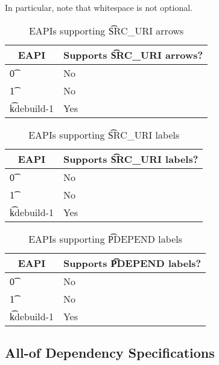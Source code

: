 In particular, note that whitespace is not optional.

\IFKDEBUILDELSE
{
    \begin{table}
    \centering
    \caption{EAPIs supporting \t{SRC\_URI} arrows} \label{uri-arrows-table}
    \begin{tabular}{ l l }
        \toprule
        \multicolumn{1}{c}{\textbf{EAPI}} &
        \multicolumn{1}{c}{\textbf{Supports \t{SRC\_URI} arrows?}} \\
        \midrule
    \t{0} & No \\
    \t{1} & No \\
    \t{kdebuild-1} & Yes \\
    \bottomrule
    \end{tabular}
    \end{table}

    \begin{table}
    \centering
    \caption{EAPIs supporting \t{SRC\_URI} labels} \label{uri-labels-table}
    \begin{tabular}{ l l }
        \toprule
        \multicolumn{1}{c}{\textbf{EAPI}} &
        \multicolumn{1}{c}{\textbf{Supports \t{SRC\_URI} labels?}} \\
        \midrule
    \t{0} & No \\
    \t{1} & No \\
    \t{kdebuild-1} & Yes \\
    \bottomrule
    \end{tabular}
    \end{table}

    \begin{table}
    \centering
    \caption{EAPIs supporting \t{PDEPEND} labels} \label{pdepend-labels-table}
    \begin{tabular}{ l l }
        \toprule
        \multicolumn{1}{c}{\textbf{EAPI}} &
        \multicolumn{1}{c}{\textbf{Supports \t{PDEPEND} labels?}} \\
        \midrule
    \t{0} & No \\
    \t{1} & No \\
    \t{kdebuild-1} & Yes \\
    \bottomrule
    \end{tabular}
    \end{table}
}{
}

\subsection{All-of Dependency Specifications}

